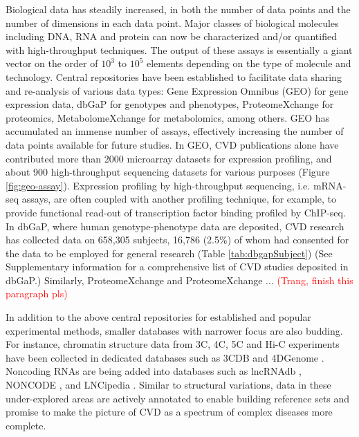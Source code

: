 \documentclass[letter]{bioinfo}
\newcommand{\comment}[1]{\textcolor{red}{#1}}
\begin{document}
	Biological data has steadily increased, in both the number of data points and the number of dimensions in each data point.
	Major classes of biological molecules including DNA, RNA and protein can now be characterized and/or quantified with high-throughput techniques. The output of these assays is essentially a giant vector on the order of $10^3$ to $10^5$ elements depending on the type of molecule and technology.
	Central repositories have been established to facilitate data sharing and re-analysis of various data types: Gene Expression Omnibus (GEO) \citep{Barrett:2013:NCBI} for gene expression data, dbGaP \citep{Tryka:2014:dbGaP} for genotypes and phenotypes, ProteomeXchange \citep{Vizcaino:2014:ProteomeXchange,Deutsch:2017:ProteomeXchange} for proteomics, MetabolomeXchange for metabolomics, among others.
	GEO has accumulated an immense number of assays, effectively increasing the number of data points available for future studies.
	In GEO, CVD publications alone have contributed more than 2000 microarray datasets for expression profiling, and about 900 high-throughput sequencing datasets for various purposes (Figure \ref{fig:geo-assay}). Expression profiling by high-throughput sequencing, i.e. mRNA-seq assays, are often coupled with another profiling technique, for example, to provide functional read-out of transcription factor binding profiled by ChIP-seq.
	In dbGaP, where human genotype-phenotype data are deposited, CVD research has collected data on 658,305 subjects, 16,786 (2.5\%) of whom had consented for the data to be employed for general research (Table \ref{tab:dbgapSubject}) (See Supplementary information for a comprehensive list of CVD studies deposited in dbGaP.) Similarly, ProteomeXchange and 
	ProteomeXchange ... \comment{(Trang, finish this paragraph pls)}
	
	In addition to the above central repositories for established and popular experimental methods, smaller databases with narrower focus are also budding. For instance, chromatin structure data from 3C, 4C, 5C and Hi-C experiments have been collected in dedicated databases such as 3CDB \citep{Yun:2016:3CDB} and 4DGenome \citep{Teng:2015:4DGenome}. Noncoding RNAs are being added into databases such as lncRNAdb \citep{Quek:2015:lncRNAdb}, NONCODE \citep{Fang:2018:NONCODEV5}, and LNCipedia \citep{Volders:2018:LNCipedia}.  Similar to structural variations, data in these under-explored areas are actively annotated to enable building reference sets and promise to make the picture of CVD as a spectrum of complex diseases more complete.
\end{document}
